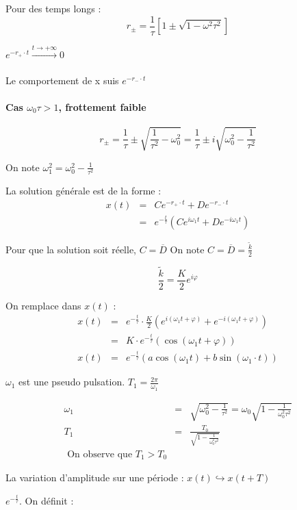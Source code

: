 	Pour des temps longs :
	\[r_{\pm} = \frac{1}{\tau}[1\pm\sqrt{1-\omega^2 \tau^2}]\]

	$e^{-r_+ \cdot t} \xrightarrow[]{t \to +\infty} 0$

	Le comportement de x suis $e^{-r_- \cdot t}$

	\paragraph{Cas $\omega_0 \tau > 1$, frottement faible}
	\[r_{\pm} = \frac{1}{\tau} \pm \sqrt{\frac{1}{\tau^2} - \omega_0^2} = \frac{1}{\tau} \pm i \sqrt{\omega_0^2 - \frac{1}{\tau^2}}\]

	On note $\omega_1^2 = \omega_0^2 - \frac{1}{\tau^2}$

	La solution générale est de la forme : 
	\[\begin{array}{rcl}
			x(t) &=& Ce^{-r_+ \cdot t} + De^{-r_- \cdot t} \\
					   &=& e^{-\frac{t}{\tau}} (Ce^{i\omega_1 t} + De^{-i\omega_1 t}) \end{array}\]

	Pour que la solution soit réelle, $C = \overline{D}$
On note $C = \overline{D} = \frac{\tilde{k}}{2}$

\[\frac{\tilde{k}}{2} = \frac{K}{2}e^{i\varphi}\]

On remplace dans $x(t)$ :
\[\begin{array}{rclr}
		x(t) &=& e^{-\frac{t}{\tau}} \cdot \frac{K}{2} (e^{i(\omega_1 t + \varphi)} + e^{-i(\omega_1 t + \varphi)}) \\
				   &=& K \cdot e^{-\frac{t}{\tau}}(\cos(\omega_1 t + \varphi)) \\
				   x(t) &=& e^{-\frac{t}{\tau}}(a\cos(\omega_1 t) + b \sin(\omega_1 \cdot t))
		\end{array}\]

	$\omega_1$ est une pseudo pulsation.
	$T_1 = \frac{2\pi}{\omega_1}$

	\[\begin{array}{rcl}
			\omega_1 &=& \sqrt{\omega_0^2 - \frac{1}{\tau^2}} = \omega_0 \sqrt{1-\frac{1}{\omega_0^2 \tau^2}} \\
			T_1 &=& \frac{T_0}{\sqrt{1 - \frac{1}{\omega_0^2  \tau^2}}} \\
	\text{ On observe que  } T_1 > T_0\end{array}\]

	La variation d'amplitude sur une période : $x(t) \hookrightarrow x(t + T)$

	$e^{-\frac{t}{\tau}}$. On définit :


